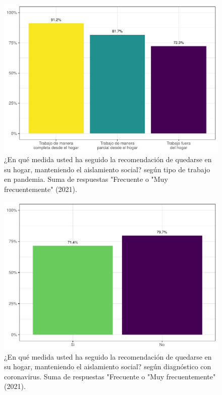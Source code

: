 \documentclass[
  12pt,
]{book}
\begin{document}
\begin{figure}

{\centering \includegraphics{reporte-elsoc_files/figure-latex/dist-telet-1} 

}

\caption{¿En qué medida usted ha seguido la recomendación de quedarse en su hogar, manteniendo el aislamiento social? según tipo de trabajo en pandemia. Suma de respuestas "Frecuente o "Muy frecuentemente" (2021).}\label{fig:dist-telet}
\end{figure}
\begin{figure}

{\centering \includegraphics{reporte-elsoc_files/figure-latex/dist-covid-1} 

}

\caption{¿En qué medida usted ha seguido la recomendación de quedarse en su hogar, manteniendo el aislamiento social? según diagnóstico con coronavirus. Suma de respuestas "Frecuente o "Muy frecuentemente" (2021).}\label{fig:dist-covid}
\end{figure}
\end{document}
